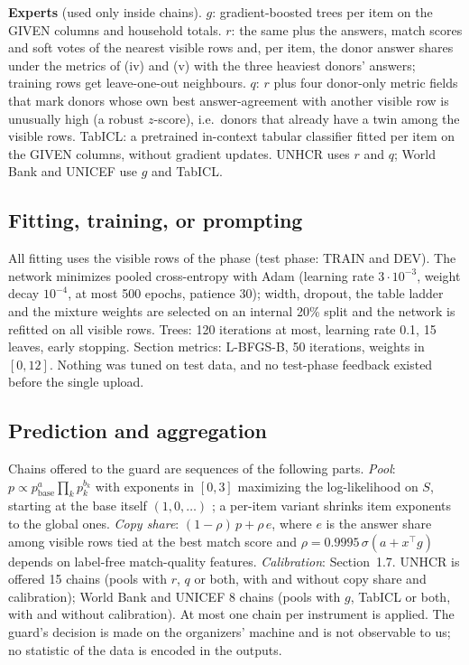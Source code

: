 \documentclass{article}
\begin{document}
\textbf{Experts} (used only inside chains).
$g$: gradient-boosted trees \citep{ke2017lightgbm,pedregosa2011} per item on the GIVEN
columns and household totals.
$r$: the same plus the answers, match scores and soft votes of the nearest visible rows and,
per item, the donor answer shares under the metrics of (iv) and (v) with the three heaviest
donors' answers; training rows get leave-one-out neighbours.
$q$: $r$ plus four donor-only metric fields that mark donors whose own best answer-agreement
with another visible row is unusually high (a robust $z$-score), i.e.\ donors that already
have a twin among the visible rows.
TabICL: a pretrained in-context tabular classifier \citep{qu2025tabicl} fitted per item on
the GIVEN columns, without gradient updates.
UNHCR uses $r$ and $q$; World Bank and UNICEF use $g$ and TabICL.

\subsection{Fitting, training, or prompting}
All fitting uses the visible rows of the phase (test phase: TRAIN and DEV). The network
minimizes pooled cross-entropy with Adam (learning rate $3\cdot10^{-3}$, weight decay
$10^{-4}$, at most 500 epochs, patience 30); width, dropout, the table ladder and the
mixture weights are selected on an internal 20\% split and the network is refitted on all
visible rows. Trees: 120 iterations at most, learning rate 0.1, 15 leaves, early stopping.
Section metrics: L-BFGS-B, 50 iterations, weights in $[0,12]$. Nothing was tuned on test
data, and no test-phase feedback existed before the single upload.

\subsection{Prediction and aggregation}
Chains offered to the guard are sequences of the following parts.
\emph{Pool}: $p \propto p_{\mathrm{base}}^{a}\prod_k p_k^{b_k}$ with exponents in $[0,3]$
maximizing the log-likelihood on $S$, starting at the base itself $(1,0,\dots)$
\citep{genest1986}; a per-item variant shrinks item exponents to the global ones.
\emph{Copy share}: $(1-\rho)\,p + \rho\,e$, where $e$ is the answer share among visible rows
tied at the best match score and $\rho = 0.9995\,\sigma(a + x^\top g)$ depends on label-free
match-quality features.
\emph{Calibration}: Section~1.7.
UNHCR is offered 15 chains (pools with $r$, $q$ or both, with and without copy share and
calibration); World Bank and UNICEF 8 chains (pools with $g$, TabICL or both, with and
without calibration). At most one chain per instrument is applied. The guard's decision is
made on the organizers' machine and is not observable to us; no statistic of the data is
encoded in the outputs.
\end{document}
